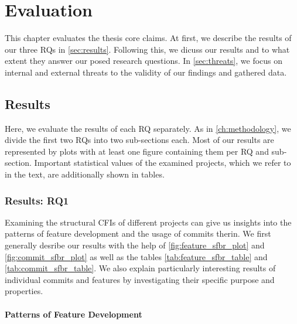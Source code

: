 \chapter{Evaluation}\label{ch:evaluation}

This chapter evaluates the thesis core claims.
At first, we describe the results of our three RQs in \autoref{sec:results}.
Following this, we dicuss our results and to what extent they answer our posed research questions.
In \autoref{sec:threats}, we focus on internal and external threats to the validity of our findings and gathered data. 

\section{Results}\label{sec:results}

Here, we evaluate the results of each RQ separately. 
As in \autoref{ch:methodology}, we divide the first two RQs into two sub-sections each.
Most of our results are represented by plots with at least one figure containing them per RQ and sub-section.
Important statistical values of the examined projects, which we refer to in the text, are additionally shown in tables.

\subsection[RQ1]{Results: RQ1} 
\label{sec:eval:RQ1}

Examining the structural CFIs of different projects can give us insights into the patterns of feature development and the usage of commits therin.
We first generally desribe our results with the help of \autoref{fig:feature_sfbr_plot} and \autoref{fig:commit_sfbr_plot} as well as the tables \ref{tab:feature_sfbr_table} and \ref{tab:commit_sfbr_table}.
We also explain particularly interesting results of individual commits and features by investigating their specific purpose and properties.

\subsubsection*{Patterns of Feature Development}\label{sec:eval_feature_development}

